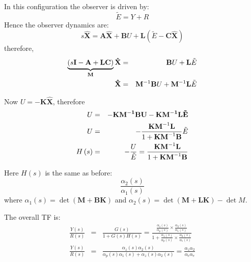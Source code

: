 \ifslidesonly
\begin{slide}
   \begin{center}
\end{center}
\end{slide}
\fi

In this configuration the observer is driven by:
\[
\tilde E =  Y + R
\] 
Hence the observer dynamics are:
\[
s\hat{\mathbf{X}}=\mathbf{A}\hat{\mathbf{X}}+\mathbf{B}U+\mathbf{L}(\tilde E - \mathbf{C}\hat{\mathbf{X}})
\]
therefore,
\begin{eqnarray*}
	\underbrace {\left( {s{\bf{I}} - {\bf{A}} + {\bf{LC}}} \right)}_{\bf{M}}{\bf{\hat X}} & = & {\bf{B}}U + {\bf{L}}\tilde E \\
	{\bf{\hat X}} & = & {\bf{M}}^{ - 1} {\bf{B}}U + {\bf{M}}^{ - 1} {\bf{L}}\tilde E
\end{eqnarray*}

Now $U=-\mathbf{K}\hat{\mathbf{X}}$, therefore
\begin{eqnarray*}
	U & = &  - \bf{KM}^{ - 1} {\bf{B}}U - {\bf{KM}}^{ - 1} {\bf{L}}\tilde E \\
	U & = &  - \frac{{{\bf{KM}}^{ - 1} {\bf{L}}}}{{1 + {\bf{KM}}^{ - 1} {\bf{B}}}}\tilde E \\
	H\left( s \right) & = &  - \frac{U}{{\tilde E}} = \frac{{{\bf{KM}}^{ - 1} {\bf{L}}}}{{1 + {\bf{KM}}^{ - 1} {\bf{B}}}}
\end{eqnarray*}

Here $H(s)$ is the same as before:
\[
\frac{\alpha_2(s)}{\alpha_1(s)}
\]
where $\alpha_1(s)=\det(\mathbf{M}+\mathbf{BK})$ and $\alpha_2(s)=\det(\mathbf{M}+\mathbf{LK})-\det{M}$.
 
The overall TF is:
\begin{eqnarray*}
	\frac{Y(s)}{R(s)} &=& \frac{G(s)}{1+G(s)H(s)}= \frac{\frac{\alpha_z(s)}{\alpha_p(s)}\times\frac{\alpha_2(s)}{\alpha_1(s)}}{1+\frac{\alpha_z(s)}{\alpha_p(s)}\times\frac{\alpha_2(s)}{\alpha_1(s)}} \\
	\frac{Y(s)}{R(s)} &=& \frac{\alpha_z(s)\alpha_2(s)}{\alpha_p(s)\alpha_1(s)+\alpha_z(s)\alpha_2(s)}=\frac{\alpha_z\alpha_2}{\alpha_c\alpha_e}
\end{eqnarray*}
 

